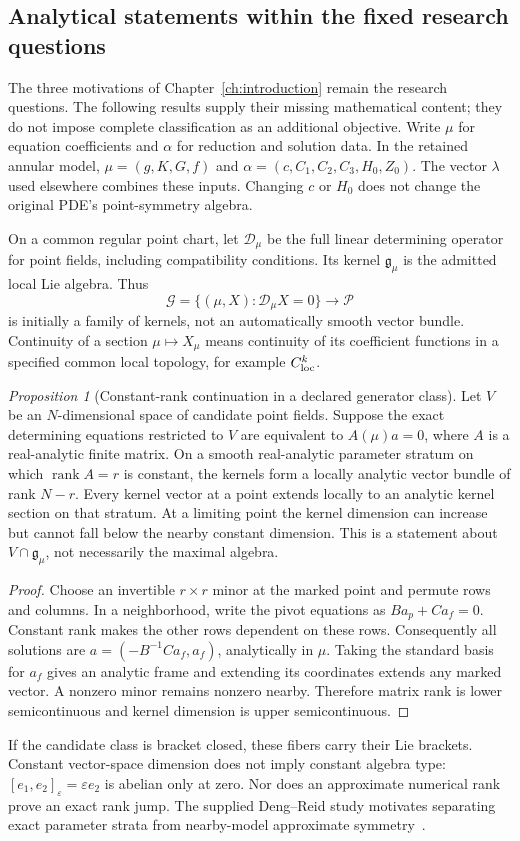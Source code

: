 \documentclass[12pt,a4paper,oneside]{report}
\numberwithin{equation}{chapter}
\theoremstyle{remark}\newtheorem{remark}[theorem]{Remark}
\newcommand{\rank}{\operatorname{rank}}
\newtheorem{suppprop}{Proposition}[chapter]
\begin{document}
\subsection*{Analytical statements within the fixed research questions}
The three motivations of Chapter~\ref{ch:introduction} remain the research
questions. The following results supply their missing mathematical content;
they do not impose complete classification as an additional objective.
Write $\mu$ for equation coefficients and $\alpha$ for reduction and solution
data. In the retained annular model,
$\mu=(g,K,G,f)$ and $\alpha=(c,C_1,C_2,C_3,H_0,Z_0)$.
The vector $\lambda$ used elsewhere combines these inputs. Changing $c$ or
$H_0$ does not change the original PDE's point-symmetry algebra.

On a common regular point chart, let $\mathscr D_\mu$ be the full linear
determining operator for point fields, including compatibility conditions.
Its kernel $\mathfrak g_\mu$ is the admitted local Lie algebra. Thus
\[
 \mathscr G=\{(\mu,X):\mathscr D_\mu X=0\}\longrightarrow\mathcal P
\]
is initially a family of kernels, not an automatically smooth vector bundle.
Continuity of a section $\mu\mapsto X_\mu$ means continuity of its coefficient
functions in a specified common local topology, for example $C^k_{\rm loc}$.

\begin{suppprop}[Constant-rank continuation in a declared generator class]
\label{prop:parameter-kernel}
Let $V$ be an $N$-dimensional space of candidate point fields. Suppose the
exact determining equations restricted to $V$ are equivalent to
$A(\mu)a=0$, where $A$ is a real-analytic finite matrix. On a smooth
real-analytic parameter stratum on which $\rank A=r$ is constant, the
kernels form a locally analytic vector bundle of rank $N-r$. Every kernel
vector at a point extends locally to an analytic kernel section on that
stratum. At a limiting point the kernel dimension can increase but cannot
fall below the nearby constant dimension. This is a statement about
$V\cap\mathfrak g_\mu$, not necessarily the maximal algebra.
\end{suppprop}
\begin{proof}
Choose an invertible $r\times r$ minor at the marked point and permute rows
and columns. In a neighborhood, write the pivot equations as
$Ba_p+Ca_f=0$. Constant rank makes the other rows dependent on these rows.
Consequently all solutions are
$a=(-B^{-1}Ca_f,a_f)$, analytically in $\mu$. Taking the standard basis for
$a_f$ gives an analytic frame and extending its coordinates extends any
marked vector. A nonzero minor remains nonzero nearby. Therefore matrix
rank is lower semicontinuous and kernel dimension is upper semicontinuous.
\end{proof}
If the candidate class is bracket closed, these fibers carry their Lie
brackets. Constant vector-space dimension does not imply constant algebra
type: $[e_1,e_2]_\varepsilon=\varepsilon e_2$ is abelian only at zero.
Nor does an approximate numerical rank prove an exact rank jump. The
supplied Deng--Reid study motivates separating exact parameter strata from
nearby-model approximate symmetry~\cite{dengreid2024}.
\end{document}
